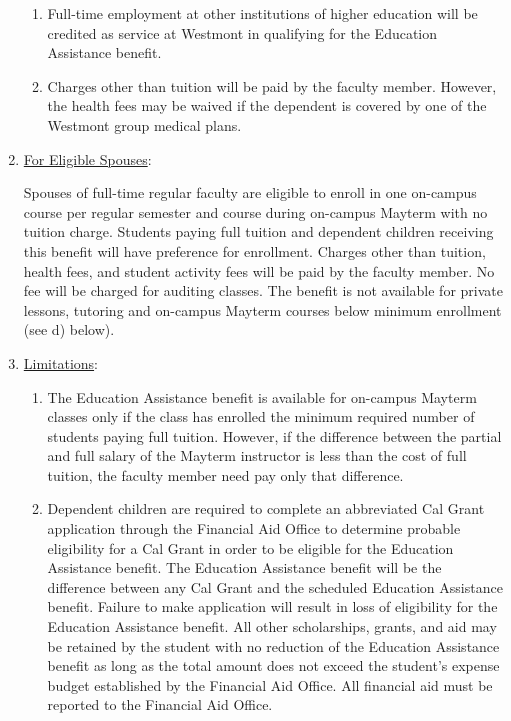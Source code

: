 \begin{enumerate}[label=\alph*)]
{\begin{enumerate}[label=\arabic*)]
							\item{Full-time employment at other institutions of
								higher education will be credited as service at
								Westmont in qualifying for the Education Assistance
								benefit.}

							\item{Charges other than tuition will be paid by the
								faculty member.  However, the health fees may be waived
								if the dependent is covered by one of the Westmont group
								medical plans.}

						\end{enumerate}
					}

					\item{\underline{For Eligible Spouses}:

						Spouses of full-time regular faculty are eligible to enroll
						in one on-campus course per regular semester and course
						during on-campus Mayterm with no tuition charge.  Students
						paying full tuition and dependent children receiving this
						benefit will have preference for enrollment.  Charges other
						than tuition, health fees, and student activity fees will be
						paid by the faculty member.  No fee will be charged for
						auditing classes.  The benefit is not available for private
						lessons, tutoring and on-campus Mayterm courses below
						minimum enrollment (see d) below). }


					\item{\underline{Limitations}:
						\label{sec:InsitutionalBenefits-Educational-Limitations}
						\begin{enumerate}[label=\arabic*)]

							\item{The Education Assistance benefit is available
								for on-campus Mayterm classes only if the class has
								enrolled the minimum required number of students
								paying full tuition.  However, if the difference
								between the partial and full salary of the
								Mayterm instructor is less than the cost of full
								tuition, the faculty member need pay only that
								difference.}

							\item{Dependent children are required to complete an
								abbreviated Cal Grant application through the
								Financial Aid Office to determine probable
								eligibility for a Cal Grant in order to be eligible
								for the Education Assistance benefit.  The Education
								Assistance benefit will be the difference
								between any Cal Grant and the scheduled
								Education Assistance benefit.  Failure to make
								application will result in loss of eligibility
								for the Education Assistance benefit.  All other
								scholarships, grants, and aid may be
								retained by the student with no reduction of
								the Education Assistance benefit as long as
								the total amount does not exceed the
								student's expense budget established by the
								Financial Aid Office.  All financial aid
								must be reported to the Financial Aid
								Office.}


\end{enumerate}}
\end{enumerate}
